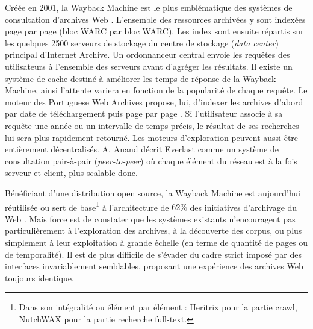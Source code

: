 \documentclass[symmetric,justified,marginals=raggedouter]{tufte-book}
\begin{document}
Créée en 2001, la Wayback Machine est le plus emblématique des systèmes de consultation d'archives Web \citep{tofel_waybackfor_2007}. L'ensemble des res\-sources archivées y sont indexées page par page (bloc WARC par bloc WARC). Les index sont ensuite répartis sur les quelques 2500 serveurs de stockage du centre de stockage (\textit{data center}) principal d'Internet Archive. Un ordonnanceur central envoie les requêtes des utilisateurs à l'ensemble des serveurs avant d'agréger les résultats. Il existe un système de cache destiné à améliorer les temps de réponse de la Wayback Machine, ainsi l'attente variera en fonction de la popularité de chaque requête. Le moteur des Portuguese Web Archives propose, lui, d'indexer les archives d'abord par date de téléchargement puis page par page \citep{costa_survey_2013}. Si l'utilisateur associe à sa requête une année ou un intervalle de temps précis, le résultat de ses recherches lui sera plus rapidement retourné. Les moteurs d'exploration peuvent aussi être entièrement décentralisés. A. Anand décrit Everlast \citep{anand_everlast:_2009} comme un système de consultation pair-à-pair (\textit{peer-to-peer}) où chaque élément du réseau est à la fois serveur et client, plus scalable donc. 

Bénéficiant d'une distribution open source, la Wayback Machine est aujourd'hui réutilisée ou sert de base\footnote{\RaggedOuter Dans son intégralité ou élément par élément : Heritrix pour la partie crawl, NutchWAX pour la partie recherche full-text.} à l'architecture de $62\%$ des initiatives d'archivage du Web \citep{costa_survey_2013}. Mais force est de constater que les systèmes existants n'encouragent pas particulièrement à l'exploration des archives, à la découverte des corpus, ou plus simplement à leur exploitation à grande échelle (en terme de quantité de pages ou de temporalité). Il est de plus difficile de s'évader du cadre strict imposé par des interfaces invariablement semblables, proposant une expérience des archives Web toujours identique.
\end{document}

